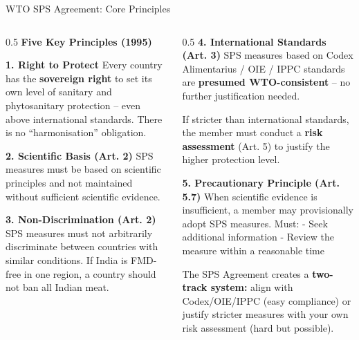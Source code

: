 \documentclass[
  ignorenonframetext,
  aspectratio=169,
]{beamer}
\makeatletter
\let\quarto@originallabel\label
\DeclareRobustCommand*{\label}[1]{\quarto@originallabel{#1}}
\makeatother
\begin{document}
\begin{frame}{WTO SPS Agreement: Core Principles}
\label{wto-sps-agreement-core-principles}
\begin{columns}[T]
\begin{column}{0.5\linewidth}
\textbf{Five Key Principles (1995)}

\textbf{1. Right to Protect} Every country has the \textbf{sovereign
right} to set its own level of sanitary and phytosanitary protection --
even above international standards. There is no ``harmonisation''
obligation.

\textbf{2. Scientific Basis (Art. 2)} SPS measures must be based on
scientific principles and not maintained without sufficient scientific
evidence.

\textbf{3. Non-Discrimination (Art. 2)} SPS measures must not
arbitrarily discriminate between countries with similar conditions. If
India is FMD-free in one region, a country should not ban all Indian
meat.
\end{column}

\begin{column}{0.5\linewidth}
\textbf{4. International Standards (Art. 3)} SPS measures based on Codex
Alimentarius / OIE / IPPC standards are \textbf{presumed WTO-consistent}
-- no further justification needed.

If stricter than international standards, the member must conduct a
\textbf{risk assessment} (Art. 5) to justify the higher protection
level.

\textbf{5. Precautionary Principle (Art. 5.7)} When scientific evidence
is insufficient, a member may provisionally adopt SPS measures. Must: -
Seek additional information - Review the measure within a reasonable
time

The SPS Agreement creates a \textbf{two-track system:} align with
Codex/OIE/IPPC (easy compliance) or justify stricter measures with your
own risk assessment (hard but possible).
\end{column}
\end{columns}
\end{frame}
\end{document}

